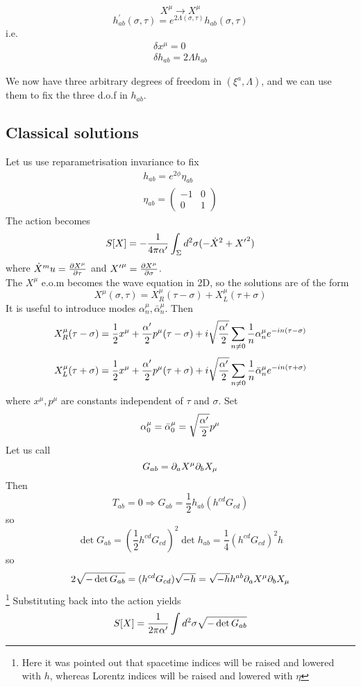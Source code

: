 \documentclass{article}
\begin{document}
\begin{definition}
\[
X^\mu \to X^\mu
\]
\[
h^\prime_{ab}(\sigma,\tau) = e^{2\Lambda(\sigma,\tau)} h_{ab}(\sigma,\tau)
\]
i.e. 
\begin{align*}
    \delta x^\mu = 0 \\
    \delta h_{ab} = 2\Lambda h_{ab}
\end{align*}
\end{definition}

We now have three arbitrary degrees of freedom in $(\xi^a,\Lambda)$, and we can use them to fix the three d.o.f in $h_{ab}$. 

\subsection{Classical solutions}
Let us use reparametrisation invariance to fix 
\begin{align*}
    h_{ab} = e^{2\phi} \eta_{ab} \\
    \eta_{ab} = \begin{pmatrix} -1 & 0 \\ 0 & 1 \end{pmatrix}
\end{align*}
The action becomes 
\[
S[X] = -\frac{1}{4\pi\cst} \int_\Sigma d^2\sigma ( -\dot{X}^2 + {X^\prime}^2 ) 
\]
where $\dot{X}^mu = \pd[X^\mu]{\tau}$ and ${X^\prime}^\mu = \pd[X^\mu]{\sigma}$. \\
The $X^\mu$ e.o.m becomes the wave equation in 2D, so the solutions are of the form 
\[
X^\mu(\sigma,\tau) = X^\mu_R(\tau-\sigma) + X^\mu_L(\tau+\sigma)
\]
It is useful to introduce modes $\alpha^\mu_n, \bar{\alpha}^\mu_n$. Then 
\[
X^\mu_R(\tau-\sigma) = \frac{1}{2} x^\mu + \frac{\cst}{2} p^\mu (\tau-\sigma) + i\sqrt{\frac{\cst}{2}} \sum_{n\neq0} \frac{1}{n} \alpha^\mu_n e^{-in(\tau-\sigma)}
\]
\[
X^\mu_L(\tau+\sigma) = \frac{1}{2} x^\mu + \frac{\cst}{2} p^\mu (\tau+\sigma) + i\sqrt{\frac{\cst}{2}} \sum_{n\neq0} \frac{1}{n} \bar{\alpha}^\mu_n e^{-in(\tau+\sigma)}
\]
where $x^\mu, p^\mu$ are constants independent of $\tau$ and $\sigma$. Set 
\[
\alpha^\mu_0 = \bar{\alpha}^\mu_0 = \sqrt{\frac{\cst}{2}} p^\mu
\]
Let us call 
\[
G_{ab} = \del_a X^\mu \del_b X_\mu
\]
Then 
\[
T_{ab}=0 \Rightarrow G_{ab}=\frac{1}{2} h_{ab} (h^{cd}G_{cd})
\]
so 
\[
\det G_{ab} = \left(\frac{1}{2}h^{cd}G_{cd} \right)^2 \det h_{ab} = \frac{1}{4}(h^{cd}G_{cd})^2 h
\]
so 
\[
2\sqrt{-\det G_{ab}} = (h^{cd}G_{cd}) \sqrt{-h} = \sqrt{-h} h^{ab} \del_a X^\mu \del_b X_\mu
\]\footnote{Here it was pointed out that spacetime indices will be raised and lowered with $h$, whereas Lorentz indices will be raised and lowered with $\eta$}
Substituting back into the action yields 
\[
S[X] = \frac{1}{2\pi\cst}\int d^2\sigma \sqrt{-\det G_{ab}}
\]
\end{document}
